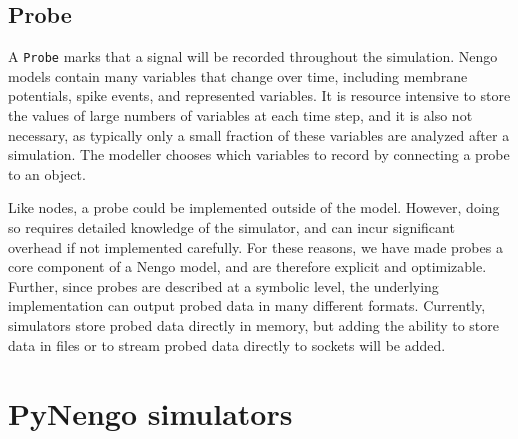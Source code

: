 \documentclass{frontiersSCNS}
\begin{document}
\subsection{Probe}

A \texttt{Probe} marks that a signal
will be recorded
throughout the simulation.
Nengo models contain many variables
that change over time,
including membrane potentials,
spike events, and represented variables.
It is resource intensive to store the values of
large numbers of variables
at each time step, and it is also not necessary,
as typically only a small fraction
of these variables are analyzed after a simulation.
The modeller chooses which variables to
record by connecting a probe to an object.

Like nodes, a probe could be implemented
outside of the model.
However, doing so requires detailed knowledge
of the simulator,
and can incur significant overhead
if not implemented carefully.
For these reasons, we have made probes
a core component of a Nengo model,
and are therefore explicit
and optimizable.
Further, since probes are described
at a symbolic level,
the underlying implementation
can output probed data in many different formats.
Currently, simulators store probed data
directly in memory,
but adding the ability to store data
in files or to stream probed data
directly to sockets will be added.

\section{PyNengo simulators} \label{sec:simulators}
\end{document}
